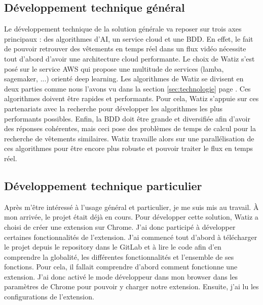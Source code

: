 \documentclass[a4paper, 12pt]{report}
\begin{document}
\subsection{Développement technique général}
Le développement technique de la solution générale va reposer sur trois axes principaux : des algorithmes d'AI, un service cloud et une BDD. En effet, le fait de pouvoir retrouver des vêtements en temps réel dans un flux vidéo nécessite tout d'abord d'avoir une architecture cloud performante. Le choix de Watiz s'est posé sur le service AWS qui propose une multitude de services (lamba, sagemaker, ...) orienté deep learning. Les algorithmes de Watiz se divisent en deux parties comme nous l'avons vu dans la section \ref{sec:technologie} page \pageref{sec:technologie}. Ces algorithmes doivent être rapides et performants. Pour cela, Watiz s'appuie sur ces partenariats avec la recherche pour développer les algorithmes les plus performants possibles. Enfin, la BDD doit être grande et diversifiée afin d'avoir des réponses cohérentes, mais ceci pose des problèmes de temps de calcul pour la recherche de vêtements similaires. Watiz travaille alors sur une parallélisation de ces algorithmes pour être encore plus robuste et pouvoir traiter le flux en temps réel.

\subsection{Développement technique particulier}
Après m'être intéressé à l'usage général et particulier, je me suis mis au travail. À mon arrivée, le projet était déjà en cours. Pour développer cette solution, Watiz a choisi de créer une extension sur Chrome. J’ai donc participé à développer certaines fonctionnalités de l'extension. J’ai commencé tout d'abord à télécharger le projet depuis le repository dans le GitLab et à lire le code afin d'en comprendre la globalité, les différentes fonctionnalités et l’ensemble de ses fonctions. Pour cela, il fallait comprendre d’abord comment fonctionne une extension. J’ai donc activé le mode développeur dans mon browser dans les paramètres de Chrome pour pouvoir y charger notre extension. Ensuite, j’ai lu les configurations de l’extension.\\
\end{document}
